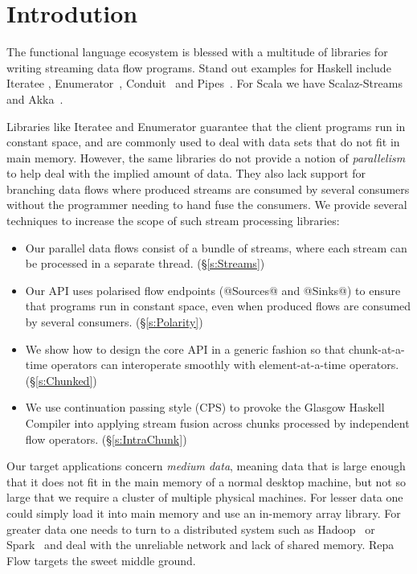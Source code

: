 \section{Introdution}

The functional language ecosystem is blessed with a multitude of libraries for writing streaming data flow programs. Stand out examples for Haskell include Iteratee \cite{Kiselyov:iteratee}, Enumerator~\cite{hackage:enumerator}, Conduit~\cite{hackage:conduit} and Pipes~\cite{hackage:pipes}. For Scala we have Scalaz-Streams~\cite{github:scalaz-streams} and Akka~\cite{github:akka}.

Libraries like Iteratee and Enumerator guarantee that the client programs run in constant space, and are commonly used to deal with data sets that do not fit in main memory. However, the same libraries do not provide a notion of \emph{parallelism} to help deal with the implied amount of data. They also lack support for branching data flows where produced streams are consumed by several consumers without the programmer needing to hand fuse the consumers. We provide several techniques to increase the scope of such stream processing libraries:

\begin{itemize}
\item Our parallel data flows consist of a bundle of streams, where each stream can be processed in a separate thread. (\S\ref{s:Streams})

\item Our API uses polarised flow endpoints (@Sources@ and @Sinks@) to ensure that programs run in constant space, even when produced flows are consumed by several consumers. (\S\ref{s:Polarity})

\item We show how to design the core API in a generic fashion so that chunk-at-a-time operators can interoperate smoothly with element-at-a-time operators. (\S\ref{s:Chunked})

\item We use continuation passing style (CPS) to provoke the Glasgow Haskell Compiler into applying stream fusion across chunks processed by independent flow operators. (\S\ref{s:IntraChunk})
\end{itemize}

Our target applications concern \emph{medium data}, meaning data that is large enough that it does not fit in the main memory of a normal desktop machine, but not so large that we require a cluster of multiple physical machines. For lesser data one could simply load it into main memory and use an in-memory array library. For greater data one needs to turn to a distributed system such as Hadoop~\cite{Shvachko:Hadoop} or Spark~\cite{Zaharia:RDDs} and deal with the unreliable network and lack of shared memory. Repa Flow targets the sweet middle ground.

